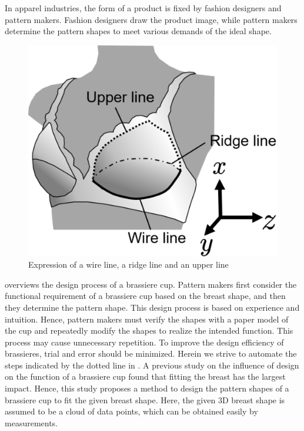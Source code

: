 \documentclass[E]{scitrans}
\begin{document}
In apparel industries, the form of a product is fixed by fashion designers and pattern makers. Fashion designers draw the product image, while pattern makers determine the pattern shapes to meet various demands of the ideal shape.
\begin{figure}[h!]
	\centering
	\includegraphics[scale=0.25]{./figure/Lines.eps}
	\caption{Expression of a wire line, a ridge line and an upper line}
	\label{fig:TwoCurves}
\end{figure}
 overviews the design process of a brassiere cup. Pattern makers first consider the functional requirement of a brassiere cup based on the breast shape, and then they determine the pattern shape. This design process is based on experience and intuition. Hence, pattern makers must verify the shapes with a paper model of the cup and repeatedly modify the shapes to realize the intended function. This process may cause unnecessary repetition. To improve the design efficiency of brassieres, trial and error should be minimized. Herein we strive to automate the steps indicated by the dotted line in . 
A previous study on the influence of design on the function of a brassiere cup found that fitting the breast has the largest impact\cite{c1}. Hence, this study proposes a method to design the pattern shapes of a brassiere cup to fit the given breast shape. Here, the given 3D breast shape is assumed to be a cloud of data points, which can be obtained easily by measurements.
\end{document}
